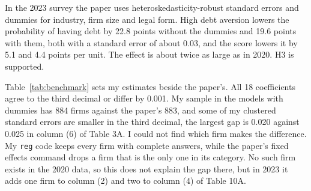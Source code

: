 \documentclass[preprint,letterpaper,11pt,authoryear]{elsarticle}
\begin{document}
In the 2023 survey the paper uses heteroskedasticity-robust standard errors and dummies for industry, firm size and legal form. High debt aversion lowers the probability of having debt by 22.8 points without the dummies and 19.6 points with them, both with a standard error of about 0.03, and the score lowers it by 5.1 and 4.4 points per unit. The effect is about twice as large as in 2020. H3 is supported.

Table~\ref{tab:benchmark} sets my estimates beside the paper's. All 18 coefficients agree to the third decimal or differ by 0.001. My sample in the models with dummies has 884 firms against the paper's 883, and some of my clustered standard errors are smaller in the third decimal, the largest gap is 0.020 against 0.025 in column (6) of Table 3A. I could not find which firm makes the difference. My \texttt{reg} code keeps every firm with complete answers, while the paper's fixed effects command drops a firm that is the only one in its category. No such firm exists in the 2020 data, so this does not explain the gap there, but in 2023 it adds one firm to column (2) and two to column (4) of Table 10A.
\end{document}
